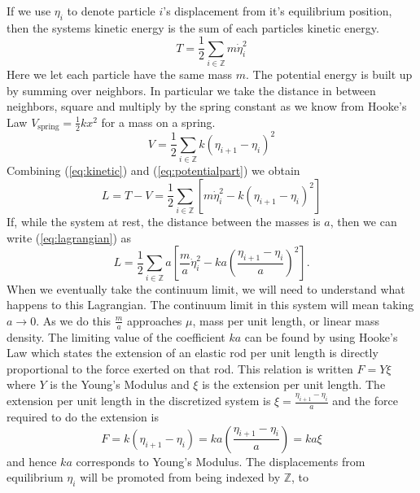 If we use \(\eta_i\) to denote particle \(i\)'s displacement from it's
equilibrium position, then the systems kinetic energy is the sum of each
particles kinetic energy.
\begin{equation}\label{eq:kinetic}
    T = \frac{1}{2}\sum_{i\in\mathbb{Z}}m\dot{\eta}_i^2
\end{equation}
Here we let each particle have the same mass \(m\). The potential energy is
built up by summing over neighbors. In particular we take the distance in
between neighbors, square and multiply by the spring constant as we know from
Hooke's Law \(V_\text{spring} = \frac{1}{2}k x^2\) for a mass on a spring.
\begin{equation}\label{eq:potentialpart}
    V = \frac{1}{2}\sum_{i\in\mathbb{Z}}k\left(\eta_{i + 1} - \eta_i\right)^2
\end{equation}
Combining (\ref{eq:kinetic}) and (\ref{eq:potentialpart}) we obtain
\begin{equation}\label{eq:lagrangian}
    L = T - V = \frac{1}{2}\sum_{i\in\mathbb{Z}}\left[m\dot{\eta}_i^2 - k\left(\eta_{i + 1} - \eta_i\right)^2\right]
\end{equation}
If, while the system at rest, the distance between the masses is \(a\), then we
can write (\ref{eq:lagrangian}) as
\begin{equation}\label{eq:lagrangianMod}
    L = \frac{1}{2}\sum_{i\in\mathbb{Z}}a\left[\frac{m}{a}\dot{\eta}_i^2 - ka\left(\frac{\eta_{i + 1} - \eta_i}{a}\right)^2\right].
\end{equation}
When we eventually take the continuum limit, we will need to understand what
happens to this Lagrangian. The continuum limit in this system will mean taking
\(a\to 0\). As we do this \(\frac{m}{a}\) approaches \(\mu\), mass per unit
length, or linear mass density. The limiting value of the coefficient \(ka\) can
be found by using Hooke's Law which states the extension of an elastic rod per
unit length is directly proportional to the force exerted on that rod. This
relation is written \(F = Y\xi\) where \(Y\) is the Young's Modulus and \(\xi\)
is the extension per unit length. The extension per unit length in the
discretized system is \(\xi = \frac{\eta_{i + 1} - \eta_i}{a}\) and the force
required to do the extension is 
\begin{equation}\label{eq:youngsMod}
    F = k(\eta_{i + 1} - \eta_i) = ka\left(\frac{\eta_{i + 1} - \eta_i}{a}\right) = ka\xi
\end{equation}
and hence \(ka\) corresponds to Young's Modulus. The displacements from
equilibrium \(\eta_i\) will be promoted from being indexed by \(\mathbb{Z}\), to
